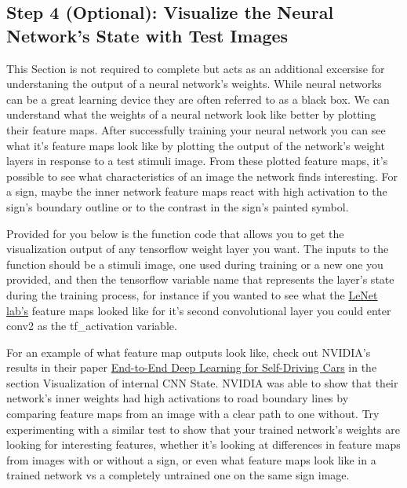 \documentclass[11pt]{article}
\begin{document}
\hypertarget{step-4-optional-visualize-the-neural-networks-state-with-test-images}{%
\subsection{Step 4 (Optional): Visualize the Neural Network's State with
Test
Images}\label{step-4-optional-visualize-the-neural-networks-state-with-test-images}}

This Section is not required to complete but acts as an additional
excersise for understaning the output of a neural network's weights.
While neural networks can be a great learning device they are often
referred to as a black box. We can understand what the weights of a
neural network look like better by plotting their feature maps. After
successfully training your neural network you can see what it's feature
maps look like by plotting the output of the network's weight layers in
response to a test stimuli image. From these plotted feature maps, it's
possible to see what characteristics of an image the network finds
interesting. For a sign, maybe the inner network feature maps react with
high activation to the sign's boundary outline or to the contrast in the
sign's painted symbol.

Provided for you below is the function code that allows you to get the
visualization output of any tensorflow weight layer you want. The inputs
to the function should be a stimuli image, one used during training or a
new one you provided, and then the tensorflow variable name that
represents the layer's state during the training process, for instance
if you wanted to see what the
\href{https://classroom.udacity.com/nanodegrees/nd013/parts/fbf77062-5703-404e-b60c-95b78b2f3f9e/modules/6df7ae49-c61c-4bb2-a23e-6527e69209ec/lessons/601ae704-1035-4287-8b11-e2c2716217ad/concepts/d4aca031-508f-4e0b-b493-e7b706120f81}{LeNet
lab's} feature maps looked like for it's second convolutional layer you
could enter conv2 as the tf\_activation variable.

For an example of what feature map outputs look like, check out NVIDIA's
results in their paper
\href{https://devblogs.nvidia.com/parallelforall/deep-learning-self-driving-cars/}{End-to-End
Deep Learning for Self-Driving Cars} in the section Visualization of
internal CNN State. NVIDIA was able to show that their network's inner
weights had high activations to road boundary lines by comparing feature
maps from an image with a clear path to one without. Try experimenting
with a similar test to show that your trained network's weights are
looking for interesting features, whether it's looking at differences in
feature maps from images with or without a sign, or even what feature
maps look like in a trained network vs a completely untrained one on the
same sign image.
\end{document}
